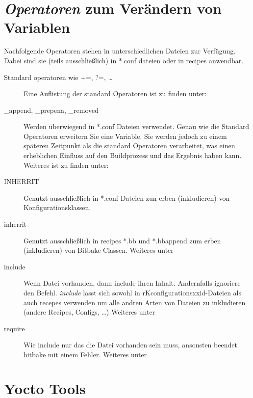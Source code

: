 \section{\textit{Operatoren} zum Verändern von Variablen}
\label{sec:grundlagen_operatoren}

Nachfolgende Operatoren stehen in unterschiedlichen Dateien zur Verfügung. Dabei
sind sie (teils ausschließlich) in *.conf dateien oder in recipes anwendbar.

\begin{description} \item[Standard operatoren wie +=, ?=, \ldots] Eine
        Auflistung der standard Operatoren ist zu finden unter: \cite[Seite
        160]{Gonzalez2018:Embedded_Linux_Development_Using_Yocto_Project_Cookbook_2nd}
    \item[\_append, \_prepena, \_removed] Werden überwiegend in *.conf Dateien
        verwendet. Genau wie die Standard Operatoren erweitern Sie eine
        Variable. Sie werden jedoch zu einem späteren Zeitpunkt als die standard
        Operatoren verarbeitet, was einen erheblichen Einfluss auf den
        Buildprozess und das Ergebnis haben kann. Weiteres ist zu finden unter:
        \cite[Seite
        160]{Gonzalez2018:Embedded_Linux_Development_Using_Yocto_Project_Cookbook_2nd}
    \item[INHERRIT] Genutzt ausschließlich in *.conf Dateien zun erben
        (inkludieren) von Konfigurationsklassen. \item[inherrit] Genutzt
        ausschließlich in recipes *.bb und *.bbappend zum erben (inkludieren)
        von Bitbake-Classen.  Weiteres unter \cite {Yocto:Mega_Manual}
    \item[include] Wenn Datei vorhanden, dann include ihren Inhalt.  Andernfalls
        ignoriere den Befehl.  \textit{include} lasst sich sowohl in
        rKconfigurationsxxid-Dateien als auch recepes verwenden um alle andren
        Arten von Dateien zu inkludieren (andere Recipes, Configs, \ldots)
        Weiteres unter \cite {Yocto:Mega_Manual} 
    \item[require] Wie include nur das die Datei vorhanden sein muss, ansonsten
        beendet bitbake mit einem Fehler.  Weiteres unter \cite
        {Yocto:Mega_Manual} \end{description}





\section{Yocto Tools}%
\label{sec:yocto_tools}

